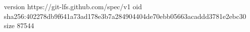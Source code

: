 version https://git-lfs.github.com/spec/v1
oid sha256:402278db9f641a73ad178e3b7a284904404de70ebb05663acaddd3781e2ebc30
size 87544
